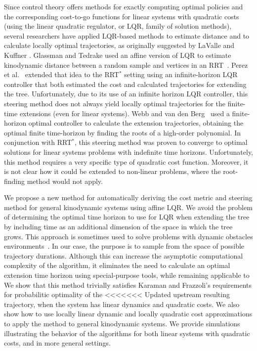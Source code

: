 \documentclass[letterpaper, 10pt, english, conference]{IEEEtran}
\begin{document}
Since control theory offers methods for exactly computing 
optimal policies and the corresponding cost-to-go functions for linear systems
with quadratic costs
(using the linear quadratic regulator, or LQR, family of solution methods),
several researchers have applied LQR-based methods
to estimate distance and to calculate locally optimal
trajectories, as originally suggested by LaValle and Kuffner
\cite{lavalle.kuffner.ijrr01}. 
%
Glassman and Tedrake 
used an affine version of LQR to 
estimate kinodynamic distance
between a random sample and vertices in an RRT~\cite{elena.russ.icra10}.
 Perez et al.~\cite{Perez12} extended
that idea to the RRT$^*$ setting using an
infinite-horizon LQR controller that both estimated 
the cost and calculated trajectories for extending the tree. 
Unfortunately, due to its use of an infinite horizon LQR controller,
this steering method does not always yield
locally optimal trajectories for the finite-time extensions (even for
linear systems). 
Webb and van den Berg~\cite{jur} 
used a finite-horizon optimal controller to calculate the extension
trajectories, obtaining the optimal finite time-horizon by
finding the roots of a high-order polynomial. In conjunction with
RRT$^*$, this steering method was proven to converge to optimal
solutions for linear systems problems with indefinite time
horizons. Unfortunately, this method requires
a very specific type of quadratic cost function.
Moreover, it is not clear
how it could be extended to non-linear problems,
where the
root-finding method would not apply.

We propose a new method for automatically deriving the cost
metric and steering method for general kinodynamic
systems using affine LQR. We avoid the problem of
determining the optimal time horizon to use for LQR when extending
the tree by 
including time as an additional dimension of the space in which the
tree grows. This approach is sometimes
used to solve problems with dynamic obstacles
environments~\cite{lavalle.book06,stillman?}. In our case, the
purpose is to sample from the space of possible trajectory
durations. Although this can increase the
asymptotic computational complexity of the algorithm, it eliminates
the need to calculate an optimal extension time horizon using
special-purpose tools, while remaining applicable to 
We show that this method trivially satisfies
Karaman and Frazzoli's requirements for probabilitic optimality of the
<<<<<<< Updated upstream
resulting trajectory, when the system has linear dynamics and 
quadratic costs. We also show how to use locally linear dynamic
and locally quadratic cost approximations to apply the method
to general kinodynamic systems. 
We provide simulations illustrating the behavior of the
algorithms for both linear systems with quadratic costs,
and in more general settings.
\end{document}
